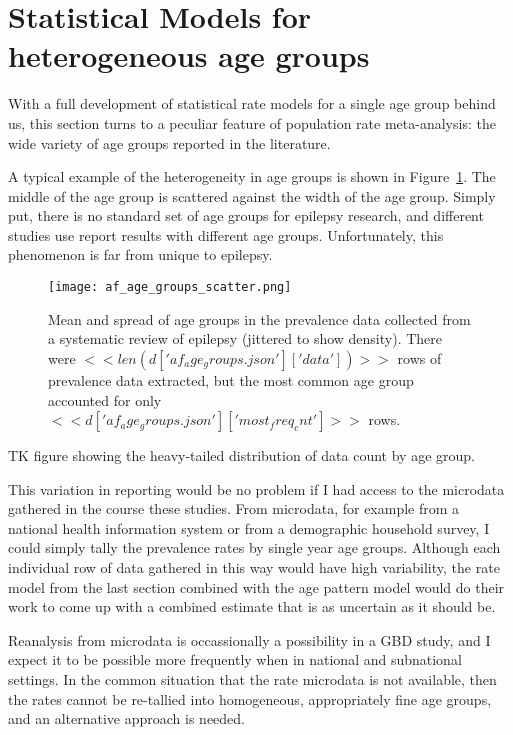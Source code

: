 \section{Statistical Models for heterogeneous age groups}
With a full development of statistical rate models for a single age
group behind us, this section turns to a peculiar feature of
population rate meta-analysis: the wide variety of age groups reported
in the literature.

A typical example of the heterogeneity in age groups is shown in
Figure~\ref{theory-age_group_model-af_age_groups}.  The middle of the
age group is scattered against the width of the age group.  Simply
put, there is no standard set of age groups for epilepsy research, and
different studies use report results with different age groups.
Unfortunately, this phenomenon is far from unique to epilepsy.

\begin{figure}[h]
\begin{center}
\texttt{[image: af\_age\_groups\_scatter.png]}
\end{center}
\caption{Mean and spread of age groups in the prevalence data collected
  from a systematic review of epilepsy (jittered to show density).
  There were $<<len(d['af_age_groups.json']['data'])>>$ rows of prevalence
  data extracted, but the most common age
  group accounted for only $<<d['af_age_groups.json']['most_freq_cnt']>>$ rows.}
\label{theory-age_group_model-af_age_groups}
\end{figure}

TK figure showing the heavy-tailed distribution of data count by age group.

This variation in reporting would be no problem if I had access to the
microdata gathered in the course these studies.  From microdata, for
example from a national health information system or from a
demographic household survey, I could simply tally the prevalence
rates by single year age groups.  Although each individual row of data
gathered in this way would have high variability, the rate model from
the last section combined with the age pattern model would do their
work to come up with a combined estimate that is as uncertain as it
should be.

Reanalysis from microdata is occassionally a possibility in a GBD
study, and I expect it to be possible more frequently when in national
and subnational settings.  In the common situation
that the rate microdata is not available, then the rates cannot be
re-tallied into homogeneous, appropriately fine age groups, and an
alternative approach is needed.


